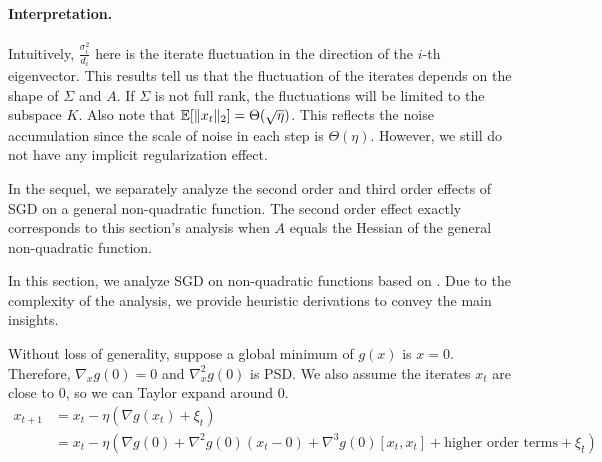 \paragraph{Interpretation.} Intuitively, $\frac{\sigma_i^2}{d_i}$ here is the iterate fluctuation in the direction of the $i$-th eigenvector. This results tell us that the fluctuation of the iterates depends on the shape of $\Sigma$ and $A$. If $\Sigma$ is not full rank, the fluctuations will be limited to the subspace $K$. Also note that $\operatorname*{\mathbb{E}}[\|x_t\|_2] = \Theta(\sqrt{\eta})$. This reflects the noise accumulation since the scale of noise in each step is $\Theta({\eta})$. However, we still do not have any implicit regularization effect. 


In the sequel, we separately analyze the second order and third order effects of SGD on a general non-quadratic function. The second order effect exactly corresponds to this section's analysis when $A$ equals the Hessian of the general non-quadratic function.


In this section, we analyze SGD on non-quadratic functions based on \cite{damian2021label}. Due to the complexity of the analysis, we provide heuristic derivations to convey the main insights. 

Without loss of generality, suppose a global minimum of $g(x)$ is $x=0$. Therefore, $\nabla_x g(0) = 0$ and $\nabla_x^2 g(0)$ is PSD. We also assume the iterates $x_t$ are close to $0$, so we can Taylor expand around $0$.
\begin{align}
x_{t+1} &= x_t - \eta(\nabla g(x_t) + \xi_t)\\
&= x_t - \eta(\nabla g(0) + \nabla^2g(0)(x_t - 0) + \nabla^3g(0)[x_t,x_t] + \text{higher order terms} + \xi_t). \label{lec17:eqn:full_gradient_update}
\end{align}

